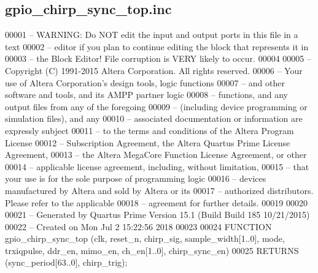 \subsection{gpio\+\_\+chirp\+\_\+sync\+\_\+top.\+inc}
\label{gpio__chirp__sync__top_8inc_source}

\begin{DoxyCode}
00001 -- WARNING: Do NOT edit the input and output ports in \textcolor{keyword}{this} file in a text
00002 -- editor \textcolor{keywordflow}{if} you plan to \textcolor{keywordflow}{continue} editing the block that represents it in
00003 -- the Block Editor! File corruption is VERY likely to occur.
00004 
00005 -- Copyright (C) 1991-2015 Altera Corporation. All rights reserved.
00006 -- Your use of Altera Corporation\textcolor{stringliteral}{'s design tools, logic functions }
00007 \textcolor{stringliteral}{-- and other software and tools, and its AMPP partner logic }
00008 \textcolor{stringliteral}{-- functions, and any output files from any of the foregoing }
00009 \textcolor{stringliteral}{-- (including device programming or simulation files), and any }
00010 \textcolor{stringliteral}{-- associated documentation or information are expressly subject }
00011 \textcolor{stringliteral}{-- to the terms and conditions of the Altera Program License }
00012 \textcolor{stringliteral}{-- Subscription Agreement, the Altera Quartus Prime License Agreement,}
00013 \textcolor{stringliteral}{-- the Altera MegaCore Function License Agreement, or other }
00014 \textcolor{stringliteral}{-- applicable license agreement, including, without limitation, }
00015 \textcolor{stringliteral}{-- that your use is for the sole purpose of programming logic }
00016 \textcolor{stringliteral}{-- devices manufactured by Altera and sold by Altera or its }
00017 \textcolor{stringliteral}{-- authorized distributors.  Please refer to the applicable }
00018 \textcolor{stringliteral}{-- agreement for further details.}
00019 \textcolor{stringliteral}{}
00020 \textcolor{stringliteral}{}
00021 \textcolor{stringliteral}{-- Generated by Quartus Prime Version 15.1 (Build Build 185 10/21/2015)}
00022 \textcolor{stringliteral}{-- Created on Mon Jul  2 15:22:56 2018}
00023 \textcolor{stringliteral}{}
00024 \textcolor{stringliteral}{FUNCTION gpio\_chirp\_sync\_top (clk, reset\_n, chirp\_sig, sample\_width[1..0], mode, trxiqpulse, ddr\_en,
       mimo\_en, ch\_en[1..0], chirp\_sync\_en)}
00025 \textcolor{stringliteral}{    RETURNS (sync\_period[63..0], chirp\_trig);}
\end{DoxyCode}
